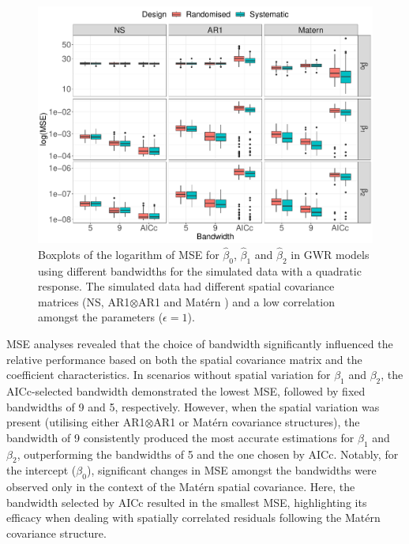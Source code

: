\documentclass[a4paper]{article} 	%
\newcommand{\Matern}{Mat\'ern }
\begin{document}
\begin{figure}[!thp]
	\centering
	\includegraphics[width=\linewidth]{Expt/Col_QuaCombMSE_newpar.pdf}
	\caption{Boxplots of the logarithm of MSE for $\hat{\beta}_0$, $\hat{\beta}_1$ and $\hat{\beta}_2$ in GWR models using different bandwidths for the simulated data with a quadratic response. The simulated data had different spatial covariance matrices (NS, AR1$\otimes$AR1 and \Matern) and a low correlation amongst the parameters ($\epsilon=1$).} \label{fig:QuadBetaMSE}
\end{figure}



MSE analyses revealed that the choice of bandwidth significantly influenced the relative performance based on both the spatial covariance matrix and the coefficient characteristics. In scenarios without spatial variation for $\beta_1$ and $\beta_2$, the AICc-selected bandwidth demonstrated the lowest MSE, followed by fixed bandwidths of 9 and 5, respectively. However, when the spatial variation was present (utilising either AR1$\otimes$AR1 or \Matern covariance structures), the bandwidth of 9 consistently produced the most accurate estimations for $\beta_1$ and $\beta_2$, outperforming the bandwidths of 5 and the one chosen by AICc. Notably, for the intercept ($\beta_0$), significant changes in MSE amongst the bandwidths were observed only in the context of the \Matern spatial covariance. Here, the bandwidth selected by AICc resulted in the smallest MSE, highlighting its efficacy when dealing with spatially correlated residuals following the \Matern covariance structure. 
\end{document}
